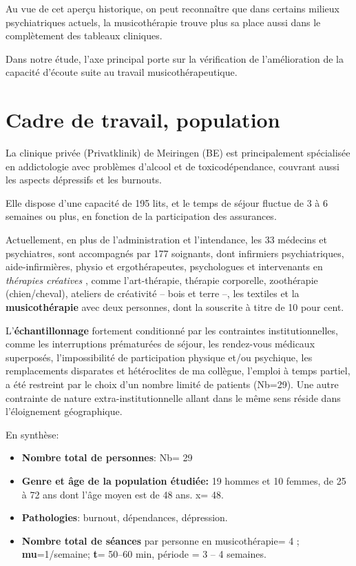 Au vue de cet aperçu historique, on peut reconnaître que
dans certains milieux psychiatriques actuels, la musicothérapie trouve plus sa place aussi dans le complètement des tableaux cliniques.

Dans notre étude, l'axe principal porte sur la
vérification de l'amélioration de
la capacité d'écoute suite au travail musicothérapeutique.

\section{Cadre de travail, population}

 La clinique privée (Privatklinik)
de Meiringen (BE) est  principalement spécialisée en
addictologie avec problèmes d'alcool et de toxicodépendance, couvrant aussi les aspects dépressifs
et les
burnouts.


Elle dispose d'une capacité de 195 lits, et le temps de séjour fluctue de 3 à 6 semaines ou plus, en
fonction de la participation des assurances.

Actuellement, en plus de l'administration et l'intendance, les 33
médecins et psychiatres, sont
accompagnés par 177
soignants, dont infirmiers psychiatriques, aide-infirmières, physio et
ergothérapeutes, 
psychologues et intervenants en \textit{thérapies
créatives }, comme l'art-thérapie, thérapie
corporelle, zoothérapie (chien/cheval),  ateliers de créativité --
bois et terre --,  les textiles et la\textbf{ musicothérapie} avec deux
personnes, dont la souscrite à titre de 10 pour cent.










L'\textbf{échantillonnage} fortement conditionné par les contraintes
institutionnelles, comme les interruptions prématurées de séjour, les rendez-vous
 médicaux superposés, l'impossibilité de participation physique et/ou
 psychique, les remplacements disparates et hétéroclites de ma
 collègue, l'emploi à
 temps partiel, a été restreint  par le choix d'un nombre limité de
 patients (Nb=29).
Une autre contrainte de nature extra-institutionnelle allant dans le
même sens réside dans l'éloignement géographique.

En synthèse:
 \begin{itemize}
 
 \item \textbf{Nombre total de personnes}: Nb= 29 
\item\textbf{Genre et âge de la population étudiée:}  19 hommes et 10 femmes, de 25 à 72
  ans dont l'âge moyen est de 48 ans. x= 48.
 \item\textbf{Pathologies}: burnout, dépendances, dépression.
 \item \textbf{Nombre total de séances} par personne en
   musicothérapie= 4 ;   \textbf{mu}=1/semaine;  
 \textbf{t}= 50--60 min, période = 3 -- 4 semaines.
\end{itemize}




